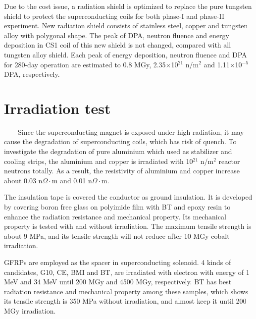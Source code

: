 \documentclass[a4paper, 10pt, twocolumn]{article}
\begin{document}
Due to the cost issue, a radiation shield is optimized to replace the pure tungsten shield to protect the superconducting coils for both phase-I and phase-II experiment.
New radiation shield consists of stainless steel, copper and tungsten alloy with polygonal shape.
The peak of DPA, neutron fluence and energy deposition in CS1 coil of this new shield is not changed, compared with all tungsten alloy shield.
Each peak of energy deposition, neutron fluence and DPA for 280-day operation are estimated to 0.8 MGy, 2.35$\times$10$^{21}$ n/m$^2$ and 1.11$\times$10$^{-5}$ DPA, respectively.
\section{Irradiation test}
~~~~Since the superconducting magnet is exposed under high radiation, it may cause the degradation of superconducting coils, which has risk of quench.
To investigate the degradation of pure aluminium which used as stabilizer and cooling strips, the aluminium and copper is irradiated with 10$^{21}$ n/m$^2$ reactor neutrons totally.
As a result, the resistivity of aluminium and copper increase about 0.03 n$\Omega\cdot$m and 0.01 n$\Omega\cdot$m.

The insulation tape is covered the conductor as ground insulation.
It is developed by covering boron free glass on polyimide film with BT and epoxy resin to enhance the radiation resistance and mechanical property.
Its mechanical property is tested with and without irradiation.
The maximum tensile strength is about 9 MPa, and its tensile strength will not reduce after 10 MGy cobalt irradiation.

GFRPs are employed as the spacer in superconducting solenoid.
4 kinds of candidates, G10, CE, BMI and BT, are irradiated with electron with energy of 1 MeV and 34 MeV until 200 MGy and 4500 MGy, respectively.
BT has best radiation resistance and mechanical property among these samples, which shows its tensile strength is 350 MPa without irradiation, and almost keep it until 200 MGy irradiation.
\end{document}
